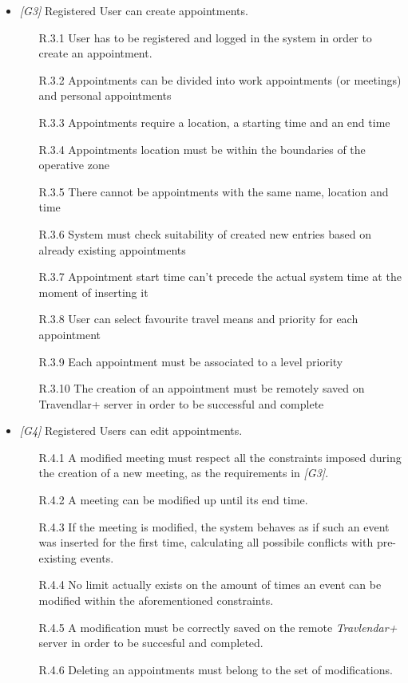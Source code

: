 \begin{itemize}
	
	\item \textit{[G3]} Registered User can create appointments.
		\begin{itemize}
			\item [R.3.1] User has to be registered and logged in the system in order to create an
appointment.
			\item [R.3.2] Appointments can be divided into work appointments (or meetings) and personal appointments
			\item [R.3.3] Appointments require a location, a starting time and an end time
			\item [R.3.4] Appointments location must be within the boundaries of the operative zone
			\item [R.3.5] There cannot be appointments with the same name, location and time
			\item [R.3.6] System must check suitability of created new entries based on already existing appointments
			\item [R.3.7] Appointment start time can't precede the actual system time at the moment of inserting it                                 							
			\item [R.3.8] User can select favourite travel means and priority for each appointment
			\item [R.3.9] Each appointment must be associated to a level priority
			\item [R.3.10] The creation of an appointment must be remotely saved on Travendlar+ server in order to be successful and complete
		\end{itemize}


	\item \textit{[G4]} Registered Users can edit appointments.
		 \begin{itemize}
		 	\item  [R.4.1] A modified meeting must respect all the constraints imposed during the creation of a new meeting, as the requirements in \textit{[G3]}.
		 	\item [R.4.2] A meeting can be modified up until its end time.
		 	\item [R.4.3] If the meeting is modified, the system behaves as if such an event was inserted for the first time, calculating all possibile conflicts with pre-existing events.
		 	\item [R.4.4] No limit actually exists on the amount of times an event can be modified within the aforementioned constraints.
		 	\item [R.4.5] A modification must be correctly saved on the remote \textit{Travlendar+} server in order to be succesful and completed.
		 	\item [R.4.6] Deleting an appointments must belong to the set of modifications.
		 \end{itemize}


\end{itemize}
